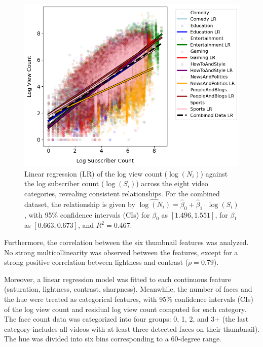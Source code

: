 \documentclass{article}
\begin{document}
\begin{figure}[h]
  \begin{minipage}[t]{0.67\textwidth}
    \vspace{0pt}  %
    \includegraphics[width=\textwidth]{figs/subscriber.png}
  \end{minipage}%
  \hspace{0.05\textwidth}%
  \begin{minipage}[t]{0.27\textwidth}
    \vspace{0pt}  %
    \caption{Linear regression (LR) of the log view count ($\log{(N_i)}$) against the log subscriber count ($\log{(S_i)}$) across the eight video categories, revealing consistent relationships. For the combined dataset, the relationship is given by $\widehat{\log(N_i)} = \hat{\beta}_0 + \hat{\beta}_1 \cdot \log(S_i)$, with 95\% confidence intervals (CIs) for $\beta_0$ as $[1.496, 1.551]$, for $\beta_1$ as $[0.663, 0.673]$, and $R^2 = 0.467$.}
    \label{fig:subscriber}
  \end{minipage}
\end{figure}

Furthermore, the correlation between the six thumbnail features was analyzed. No strong multicollinearity was observed between the features, except for a strong positive correlation between lightness and contrast ($\rho=0.79$).

Moreover, a linear regression model was fitted to each continuous feature (saturation, lightness, contrast, sharpness). Meanwhile, the number of faces and the hue were treated as categorical features, with 95\% confidence intervals (CIs) of the log view count and residual log view count computed for each category. The face count data was categorized into four groups: 0, 1, 2, and 3+ (the last category includes all videos with at least three detected faces on their thumbnail). The hue was divided into six bins corresponding to a 60-degree range.
\end{document}
